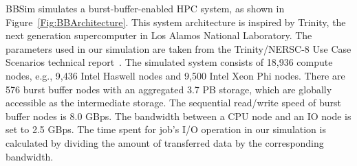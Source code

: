 


BBSim simulates a burst-buffer-enabled HPC system, as shown in Figure~\ref{Fig:BBArchitecture}.
This system architecture is inspired by Trinity, 
the next generation supercomputer in Los Alamos National Laboratory.
The parameters used in our simulation are taken from the 
Trinity/NERSC-8 Use Case Scenarios technical report~\cite{TrinitySystem}.
The simulated system consists of 18,936 compute nodes,
e.g., 9,436 Intel Haswell nodes and 9,500 Intel Xeon Phi nodes.
There are 576 burst buffer nodes with an aggregated 3.7 PB storage, which are globally accessible as the intermediate storage.
The sequential read/write speed of burst buffer nodes is 8.0 GBps.
The bandwidth between a CPU node and an IO node is set to 2.5 GBps.
The time spent for job's I/O operation in our simulation is calculated by
dividing the amount of transferred data by the corresponding bandwidth.

